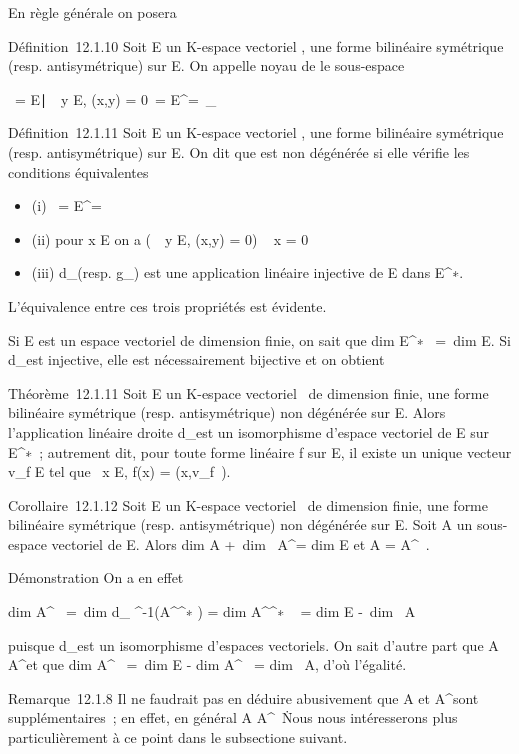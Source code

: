 \documentclass[]{article}
\begin{document}
En règle générale on posera

Définition~12.1.10 Soit E un K-espace vectoriel , \phi une forme bilinéaire
symétrique (resp. antisymétrique) sur E. On appelle noyau de \phi le
sous-espace

\mathrmKer~\phi =
\x \in
E∣\forall~~y \in E, \phi(x,y) =
0\ = E^\bot =\
\mathrmKerd_ \phi

Définition~12.1.11 Soit E un K-espace vectoriel , \phi une forme bilinéaire
symétrique (resp. antisymétrique) sur E. On dit que \phi est non dégénérée
si elle vérifie les conditions équivalentes

\begin{itemize}
\itemsep1pt\parskip0pt
\item
  (i) \mathrmKer~\phi =
  E^\bot = \0\
\item
  (ii) pour x \in E on a \left
  (\forall~~y \in E, \phi(x,y) = 0\right ) \rigtharrow~
  x = 0
\item
  (iii) d_\phi (resp. g_\phi) est une application linéaire
  injective de E dans E^∗.
\end{itemize}

L'équivalence entre ces trois propriétés est évidente.

Si E est un espace vectoriel de dimension finie, on sait que
dim E^∗~ =\
dim E. Si d_\phi est injective, elle est nécessairement
bijective et on obtient

Théorème~12.1.11 Soit E un K-espace vectoriel ~de dimension finie, \phi une
forme bilinéaire symétrique (resp. antisymétrique) non dégénérée sur E.
Alors l'application linéaire droite d_\phi est un isomorphisme
d'espace vectoriel de E sur E^∗~; autrement dit, pour toute
forme linéaire f sur E, il existe un unique vecteur v_f \in E tel
que \forall~x \in E, f(x) = \phi(x,v_f~).

Corollaire~12.1.12 Soit E un K-espace vectoriel ~de dimension finie, \phi
une forme bilinéaire symétrique (resp. antisymétrique) non dégénérée sur
E. Soit A un sous-espace vectoriel de E. Alors
dim A +\ dim~
A^\bot = dim E et A = A^\bot\bot~.

Démonstration On a en effet

dim A^\bot~ =\
dim d_ \phi^-1(A^\bot^∗ )
= dim A^\bot^∗ ~
= dim E -\ dim~ A

puisque d_\phi est un isomorphisme d'espaces vectoriels. On sait
d'autre part que A \subset~ A^\bot\bot et que
dim A^\bot\bot~ =\
dim E - dim A^\bot~
= dim~ A, d'où l'égalité.

Remarque~12.1.8 Il ne faudrait pas en déduire abusivement que A et
A^\bot sont supplémentaires~; en effet, en général A \bigcap
A^\bot\neq~\0\.
Nous nous intéresserons plus particulièrement à ce point dans le
subsectione suivant.
\end{document}
